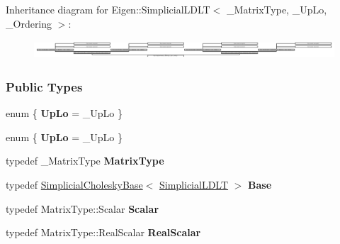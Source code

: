 Inheritance diagram for Eigen\+:\+:Simplicial\+L\+D\+LT$<$ \+\_\+\+Matrix\+Type, \+\_\+\+Up\+Lo, \+\_\+\+Ordering $>$\+:\begin{figure}[H]
\begin{center}
\leavevmode
\includegraphics[height=0.694444cm]{group___sparse_cholesky___module}
\end{center}
\end{figure}
\subsubsection*{Public Types}
\begin{DoxyCompactItemize}
\item 
\mbox{\label{group___sparse_cholesky___module_a5b8fda8f30962fa98b808edf5ebcdf15}} 
enum \{ {\bfseries Up\+Lo} = \+\_\+\+Up\+Lo
 \}
\item 
\mbox{\label{group___sparse_cholesky___module_ab2990b48420cb7aeffce868daa8cc53c}} 
enum \{ {\bfseries Up\+Lo} = \+\_\+\+Up\+Lo
 \}
\item 
\mbox{\label{group___sparse_cholesky___module_a75c4a9713dc57cea09c05185a93398b6}} 
typedef \+\_\+\+Matrix\+Type {\bfseries Matrix\+Type}
\item 
\mbox{\label{group___sparse_cholesky___module_a80564e6741d039a3b7b2b71a96639678}} 
typedef \hyperlink{group___sparse_cholesky___module_class_eigen_1_1_simplicial_cholesky_base}{Simplicial\+Cholesky\+Base}$<$ \hyperlink{group___sparse_cholesky___module_class_eigen_1_1_simplicial_l_d_l_t}{Simplicial\+L\+D\+LT} $>$ {\bfseries Base}
\item 
\mbox{\label{group___sparse_cholesky___module_a95c4c66916a223d1b9ab67ef1f40ddea}} 
typedef Matrix\+Type\+::\+Scalar {\bfseries Scalar}
\item 
\mbox{\label{group___sparse_cholesky___module_a2d8d8a511f80f5fc755ec719d8ec468f}} 
typedef Matrix\+Type\+::\+Real\+Scalar {\bfseries Real\+Scalar}
\item 

\end{DoxyCompactItemize}
